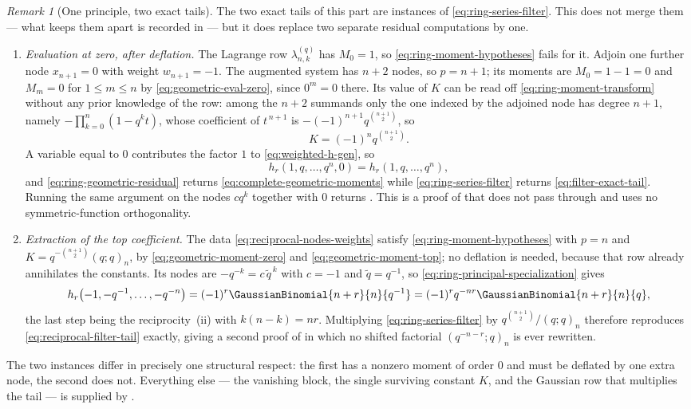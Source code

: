 \documentclass[11pt,a4paper,oneside,openany]{book}
\theoremstyle{definition}
\theoremstyle{remark}
\newtheorem{remark}[remark]{Remark}
\begin{document}
\begin{remark}[One principle, two exact tails]\label{rem:one-principle-two-filters}
The two exact tails of this part are instances of
\eqref{eq:ring-series-filter}.  This does not merge them --- what keeps them
apart is recorded in  --- but it does replace two
separate residual computations by one.
\begin{enumerate}[label=\textup{(\roman*)}]
\item \emph{Evaluation at zero, after deflation.}  The Lagrange row
 $\lambda^{(q)}_{n,k}$ has $M_0=1$, so \eqref{eq:ring-moment-hypotheses} fails
 for it.  Adjoin one further node $x_{n+1}=0$ with weight $w_{n+1}=-1$.  The
 augmented system has $n+2$ nodes, so $p=n+1$; its moments are $M_0=1-1=0$ and
 $M_m=0$ for $1\le m\le n$ by \eqref{eq:geometric-eval-zero}, since $0^m=0$
 there.  Its value of $K$ can be read off \eqref{eq:ring-moment-transform}
 without any prior knowledge of the row: among the $n+2$ summands only the one
 indexed by the adjoined node has degree $n+1$, namely
 $-\prod_{k=0}^{n}(1-q^kt)$, whose coefficient of $t^{\,n+1}$ is
 $-(-1)^{n+1}q^{\binom{n+1}{2}}$, so
 \[
 K=(-1)^nq^{\binom{n+1}{2}}.
 \]
 A variable equal to $0$ contributes the factor $1$ to
 \eqref{eq:weighted-h-gen}, so
 \[
  h_r(1,q,\ldots,q^n,0)=h_r(1,q,\ldots,q^n),
 \]
 and \eqref{eq:ring-geometric-residual} returns
 \eqref{eq:complete-geometric-moments} while \eqref{eq:ring-series-filter}
 returns \eqref{eq:filter-exact-tail}.  Running the same argument on the nodes
 $cq^k$ together with $0$ returns .  This is
 a proof of  that does not pass through
  and uses no symmetric-function
 orthogonality.
\item \emph{Extraction of the top coefficient.}  The data
 \eqref{eq:reciprocal-nodes-weights} satisfy \eqref{eq:ring-moment-hypotheses}
 with $p=n$ and $K=q^{-\binom{n+1}{2}}(q;q)_n$, by \eqref{eq:geometric-moment-zero}
 and \eqref{eq:geometric-moment-top}; no deflation is needed, because that row
 already annihilates the constants.  Its nodes are $-q^{-k}=c\,\tilde q^{\,k}$
 with $c=-1$ and $\tilde q=q^{-1}$, so
 \eqref{eq:ring-principal-specialization} gives
 \[
 h_r\bigl(-1,-q^{-1},\ldots,-q^{-n}\bigr)
 =(-1)^r\GaussianBinomial{n+r}{n}{q^{-1}}
 =(-1)^rq^{-nr}\GaussianBinomial{n+r}{n}{q},
 \]
 the last step being the reciprocity \,(ii) with
 $k(n-k)=nr$.  Multiplying \eqref{eq:ring-series-filter} by
 $q^{\binom{n+1}{2}}/(q;q)_n$ therefore reproduces
 \eqref{eq:reciprocal-filter-tail} exactly, giving a second proof of
  in which no shifted factorial
 $(q^{-n-r};q)_n$ is ever rewritten.
\end{enumerate}
The two instances differ in precisely one structural respect: the first has a
nonzero moment of order $0$ and must be deflated by one extra node, the second
does not.  Everything else --- the vanishing block, the single surviving
constant $K$, and the Gaussian row that multiplies the tail --- is supplied by
.
\end{remark}
\end{document}
